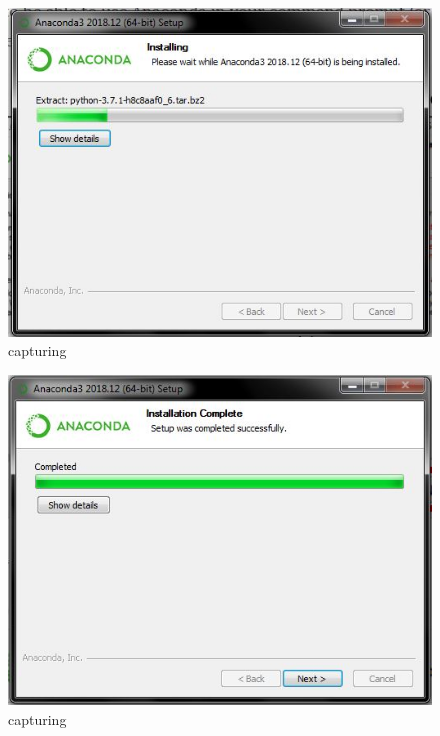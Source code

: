 \begin{enumerate}
\begin{itemize}
\begin{figure}[ht]
\centering
\includegraphics[scale=0.5]{figures/6.jpg}
\caption{capturing}
\label{proses instalasi}
\end{figure}

\begin{figure}[ht]
\centering
\includegraphics[scale=0.5]{figures/7.jpg}
\caption{capturing}
\label{proses instalasi}
\end{figure}


\end{itemize}
\end{enumerate}
